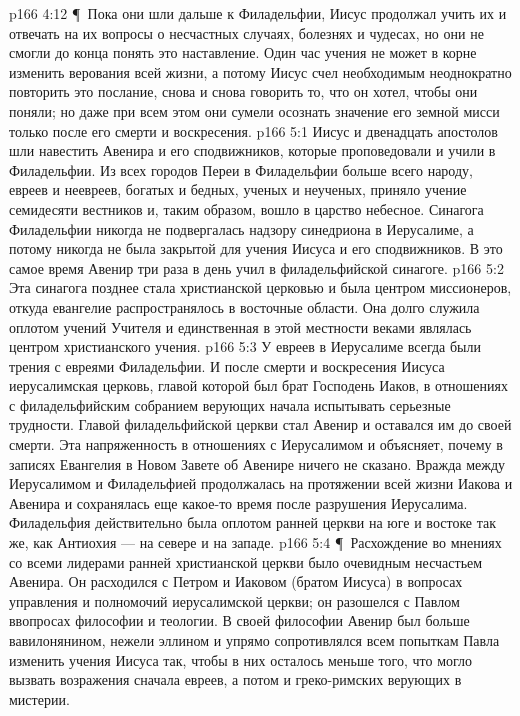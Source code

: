\vs p166 4:12 \P\ Пока они шли дальше к Филадельфии, Иисус продолжал учить их и отвечать на их вопросы о несчастных случаях, болезнях и чудесах, но они не смогли до конца понять это наставление. Один час учения не может в корне изменить верования всей жизни, а потому Иисус счел необходимым неоднократно повторить это послание, снова и снова говорить то, что он хотел, чтобы они поняли; но даже при всем этом они сумели осознать значение его земной мисси только после его смерти и воскресения.
\vs p166 5:1 Иисус и двенадцать апостолов шли навестить Авенира и его сподвижников, которые проповедовали и учили в Филадельфии. Из всех городов Переи в Филадельфии больше всего народу, евреев и неевреев, богатых и бедных, ученых и неученых, приняло учение семидесяти вестников и, таким образом, вошло в царство небесное. Синагога Филадельфии никогда не подвергалась надзору синедриона в Иерусалиме, а потому никогда не была закрытой для учения Иисуса и его сподвижников. В это самое время Авенир три раза в день учил в филадельфийской синагоге.
\vs p166 5:2 Эта синагога позднее стала христианской церковью и была центром миссионеров, откуда евангелие распространялось в восточные области. Она долго служила оплотом учений Учителя и единственная в этой местности веками являлась центром христианского учения.
\vs p166 5:3 У евреев в Иерусалиме всегда были трения с евреями Филадельфии. И после смерти и воскресения Иисуса иерусалимская церковь, главой которой был брат Господень Иаков, в отношениях с филадельфийским собранием верующих начала испытывать серьезные трудности. Главой филадельфийской церкви стал Авенир и оставался им до своей смерти. Эта напряженность в отношениях с Иерусалимом и объясняет, почему в записях Евангелия в Новом Завете об Авенире ничего не сказано. Вражда между Иерусалимом и Филадельфией продолжалась на протяжении всей жизни Иакова и Авенира и сохранялась еще какое\hyp{}то время после разрушения Иерусалима. Филадельфия действительно была оплотом ранней церкви на юге и востоке так же, как Антиохия --- на севере и на западе.
\vs p166 5:4 \P\ Расхождение во мнениях со всеми лидерами ранней христианской церкви было очевидным несчастьем Авенира. Он расходился с Петром и Иаковом (братом Иисуса) в вопросах управления и полномочий иерусалимской церкви; он разошелся с Павлом ввопросах философии и теологии. В своей философии Авенир был больше вавилонянином, нежели эллином и упрямо сопротивлялся всем попыткам Павла изменить учения Иисуса так, чтобы в них осталось меньше того, что могло вызвать возражения сначала евреев, а потом и греко\hyp{}римских верующих в мистерии.
